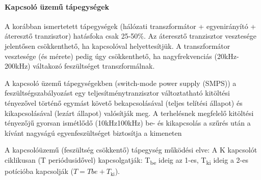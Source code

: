 \paragraph{Kapcsoló üzemű tápegységek} A korábban ismertetett tápegységek (hálózati transzformátor + egyenirányító + áteresztő tranzisztor) hatásfoka csak 25-50\%. Az áteresztő tranzisztor vesztesége jelentősen csökkenthető, ha kapcsolóval helyettesítjük. A transzformátor vesztesége (és mérete) pedig úgy csökkenthető, ha nagyfrekvenciás (20kHz-200kHz) váltakozó feszültséget transzformálnak.

A kapcsoló üzemű tápegységekben (switch-mode power supply (SMPS)) a feszültségszabályozást egy teljesítménytranzisztor változtatható kitöltési tényezővel történő egymást követő bekapcsolásával (teljes telítési állapot) és kikapcsolásával (lezárt állapot) valósítják meg. A terhelésnek megfelelő kitöltési tényezőjű gyorsan ismétlődő (10kHz\textendash100kHz) be- és kikapcsolás a szűrés után a kívánt nagyságú egyenfeszültséget biztosítja a kimeneten

A kapcsolóüzemű (feszültség csökkentő) tápegység működési elve: A K kapcsolót ciklikusan (T periódusidővel) kapcsolgatják: T\textsubscript{be} ideig az 1-es, T\textsubscript{ki} ideig a 2-es potícióba kapcsolják ($T=T be +T_\text{ki}$).

